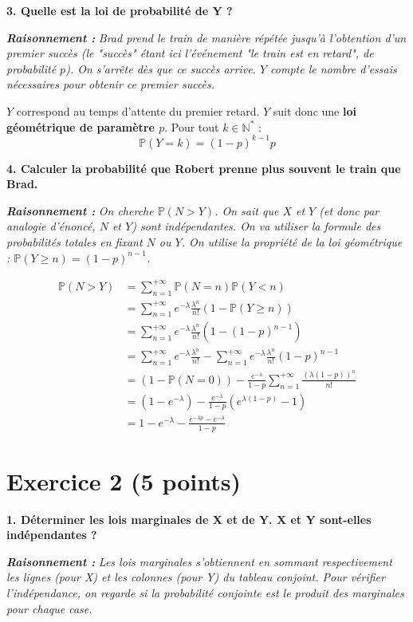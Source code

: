 \documentclass[11pt,a4paper]{article}
\newcommand{\raisonnement}[1]{
    \vspace{0.2cm}
    \noindent\textcolor{blue!70!black}{
        \textbf{\textit{Raisonnement : }} \textit{#1}
    }
    \vspace{0.2cm}
}
\begin{document}
\textbf{3. Quelle est la loi de probabilité de Y ?}
\raisonnement{Brad prend le train de manière répétée jusqu'à l'obtention d'un premier succès (le "succès" étant ici l'événement "le train est en retard", de probabilité $p$). On s'arrête dès que ce succès arrive. $Y$ compte le nombre d'essais nécessaires pour obtenir ce premier succès.}

$Y$ correspond au temps d'attente du premier retard. $Y$ suit donc une \textbf{loi géométrique de paramètre $p$}.
Pour tout $k \in \mathbb{N}^*$ :
$$ \mathbb{P}(Y=k) = (1-p)^{k-1}p $$

\textbf{4. Calculer la probabilité que Robert prenne plus souvent le train que Brad.}
\raisonnement{On cherche $\mathbb{P}(N > Y)$. On sait que $X$ et $Y$ (et donc par analogie d'énoncé, $N$ et $Y$) sont indépendantes. On va utiliser la formule des probabilités totales en fixant $N$ ou $Y$. On utilise la propriété de la loi géométrique : $\mathbb{P}(Y \ge n) = (1-p)^{n-1}$.}

\begin{align*}
\mathbb{P}(N > Y) &= \sum_{n=1}^{+\infty} \mathbb{P}(N=n) \mathbb{P}(Y < n) \\
&= \sum_{n=1}^{+\infty} e^{-\lambda} \frac{\lambda^n}{n!} \left(1 - \mathbb{P}(Y \ge n)\right) \\
&= \sum_{n=1}^{+\infty} e^{-\lambda} \frac{\lambda^n}{n!} \left(1 - (1-p)^{n-1}\right) \\
&= \sum_{n=1}^{+\infty} e^{-\lambda} \frac{\lambda^n}{n!} - \sum_{n=1}^{+\infty} e^{-\lambda} \frac{\lambda^n}{n!} (1-p)^{n-1} \\
&= (1 - \mathbb{P}(N=0)) - \frac{e^{-\lambda}}{1-p} \sum_{n=1}^{+\infty} \frac{(\lambda(1-p))^n}{n!} \\
&= (1 - e^{-\lambda}) - \frac{e^{-\lambda}}{1-p} \left( e^{\lambda(1-p)} - 1 \right) \\
&= 1 - e^{-\lambda} - \frac{e^{-\lambda p} - e^{-\lambda}}{1-p}
\end{align*}


\vspace{0.5cm}
\section*{Exercice 2 (5 points)}

\textbf{1. Déterminer les lois marginales de X et de Y. X et Y sont-elles indépendantes ?}
\raisonnement{Les lois marginales s'obtiennent en sommant respectivement les lignes (pour X) et les colonnes (pour Y) du tableau conjoint. Pour vérifier l'indépendance, on regarde si la probabilité conjointe est le produit des marginales pour chaque case.}
\end{document}
